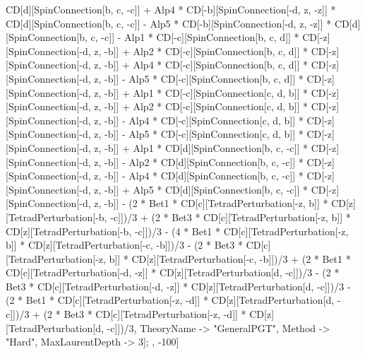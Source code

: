 CD[d][SpinConnection[b, c, -c]] + Alp4 * CD[-b][SpinConnection[-d, z, -z]] * CD[d][SpinConnection[b, c, -c]] - Alp5 * CD[-b][SpinConnection[-d, z, -z]] * CD[d][SpinConnection[b, c, -c]] - Alp1 * CD[-c][SpinConnection[b, c, d]] * CD[-z][SpinConnection[-d, z, -b]] + Alp2 * CD[-c][SpinConnection[b, c, d]] * CD[-z][SpinConnection[-d, z, -b]] + Alp4 * CD[-c][SpinConnection[b, c, d]] * CD[-z][SpinConnection[-d, z, -b]] - Alp5 * CD[-c][SpinConnection[b, c, d]] * CD[-z][SpinConnection[-d, z, -b]] + Alp1 * CD[-c][SpinConnection[c, d, b]] * CD[-z][SpinConnection[-d, z, -b]] + Alp2 * CD[-c][SpinConnection[c, d, b]] * CD[-z][SpinConnection[-d, z, -b]] - Alp4 * CD[-c][SpinConnection[c, d, b]] * CD[-z][SpinConnection[-d, z, -b]] - Alp5 * CD[-c][SpinConnection[c, d, b]] * CD[-z][SpinConnection[-d, z, -b]] + Alp1 * CD[d][SpinConnection[b, c, -c]] * CD[-z][SpinConnection[-d, z, -b]] - Alp2 * CD[d][SpinConnection[b, c, -c]] * CD[-z][SpinConnection[-d, z, -b]] - Alp4 * CD[d][SpinConnection[b, c, -c]] * CD[-z][SpinConnection[-d, z, -b]] + Alp5 * CD[d][SpinConnection[b, c, -c]] * CD[-z][SpinConnection[-d, z, -b]] - (2 * Bet1 * CD[c][TetradPerturbation[-z, b]] * CD[z][TetradPerturbation[-b, -c]])/3 + (2 * Bet3 * CD[c][TetradPerturbation[-z, b]] * CD[z][TetradPerturbation[-b, -c]])/3 - (4 * Bet1 * CD[c][TetradPerturbation[-z, b]] * CD[z][TetradPerturbation[-c, -b]])/3 - (2 * Bet3 * CD[c][TetradPerturbation[-z, b]] * CD[z][TetradPerturbation[-c, -b]])/3 + (2 * Bet1 * CD[c][TetradPerturbation[-d, -z]] * CD[z][TetradPerturbation[d, -c]])/3 - (2 * Bet3 * CD[c][TetradPerturbation[-d, -z]] * CD[z][TetradPerturbation[d, -c]])/3 - (2 * Bet1 * CD[c][TetradPerturbation[-z, -d]] * CD[z][TetradPerturbation[d, -c]])/3 + (2 * Bet3 * CD[c][TetradPerturbation[-z, -d]] * CD[z][TetradPerturbation[d, -c]])/3, TheoryName -> "GeneralPGT", Method -> "Hard", MaxLaurentDepth -> 3]; , -100]